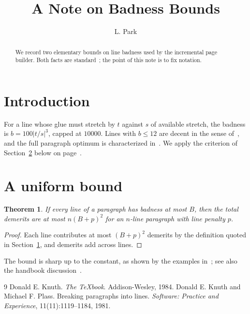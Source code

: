 \documentclass[11pt]{amsart}
\title{A Note on Badness Bounds}
\author{L. Park}
\date{}
\newtheorem{theorem}{Theorem}
\begin{document}
\maketitle
\tableofcontents

\begin{abstract}
We record two elementary bounds on line badness used by the incremental
page builder. Both facts are standard~\cite{knuth-plass,texbook}; the point
of this note is to fix notation.
\end{abstract}

\section{Introduction}
\label{sec:intro}

For a line whose glue must stretch by $t$ against $s$ of available stretch,
the badness is $b = 100\lvert t/s\rvert^3$, capped at $10000$. Lines with
$b \le 12$ are decent in the sense of~\cite{texbook}, and the full
paragraph optimum is characterized in~\cite{knuth-plass}. We apply the
criterion of Section~\ref{sec:bound} below on page~\pageref{sec:bound}.

\section{A uniform bound}
\label{sec:bound}

\begin{theorem}
If every line of a paragraph has badness at most $B$, then the total
demerits are at most $n(B + p)^2$ for an $n$-line paragraph with line
penalty $p$.
\end{theorem}

\begin{proof}
Each line contributes at most $(B+p)^2$ demerits by the definition quoted in
Section~\ref{sec:intro}, and demerits add across lines.
\end{proof}

The bound is sharp up to the constant, as shown by the examples
in~\cite{knuth-plass}; see also the handbook discussion~\cite{texbook}.

\begin{thebibliography}{9}
 Donald E. Knuth. \emph{The \TeX book}. Addison-Wesley, 1984.
 Donald E. Knuth and Michael F. Plass. Breaking
  paragraphs into lines. \emph{Software: Practice and Experience},
  11(11):1119--1184, 1981.
\end{thebibliography}
\end{document}
